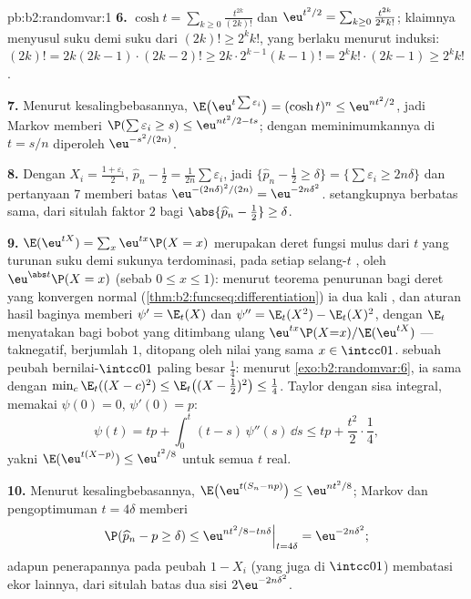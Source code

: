 \begin{solution}{pb:b2:randomvar:1}
\textbf{6.} $\cosh t = \sum_{k\geq0}\frac{t^{2k}}{(2k)!}$ dan
$\eu^{t^2/2} = \sum_{k\geq0}\frac{t^{2k}}{2^kk!}$; klaimnya
menyusul suku demi suku dari $(2k)! \geq 2^kk!$, yang berlaku menurut
induksi: $(2k)! = 2k(2k-1)\cdot(2k-2)! \geq 2k\cdot
2^{k-1}(k-1)! = 2^kk!\cdot(2k-1) \geq 2^kk!$.

\textbf{7.} Menurut kesalingbebasannya, $\E\bigl(\eu^{t\sum\varepsilon_i}
\bigr) = (\cosh t)^n \leq \eu^{nt^2/2}$, jadi Markov memberi
$\P(\sum\varepsilon_i \geq s) \leq \eu^{nt^2/2 - ts}$; dengan
meminimumkannya di $t = s/n$ diperoleh $\eu^{-s^2/(2n)}$.

\textbf{8.} Dengan $X_i = \frac{1 + \varepsilon_i}2$, $\widehat
p_n - \frac12 = \frac1{2n}\sum\varepsilon_i$, jadi
$\{\widehat p_n - \frac12 \geq \delta\} =
\{\sum\varepsilon_i \geq 2n\delta\}$ dan pertanyaan 7 memberi
batas $\eu^{-(2n\delta)^2/(2n)} = \eu^{-2n\delta^2}$. 
setangkupnya berbatas sama, dari situlah faktor $2$ bagi
$\abs{\widehat p_n - \frac12} \geq \delta$.

\textbf{9.} $\E(\eu^{tX}) = \sum_x\eu^{tx}\P(X = x)$ merupakan
deret fungsi mulus dari $t$ yang turunan suku demi
sukunya terdominasi, pada setiap selang-$t$ , oleh
$\eu^{\abs t}\P(X = x)$ (sebab $0 \leq x \leq 1$): menurut
teorema penurunan bagi deret yang konvergen normal
(\cref{thm:b2:funcseq:differentiation}) ia dua kali
, dan aturan hasil baginya memberi $\psi' = \E_t(X)$
dan $\psi'' = \E_t(X^2) - \E_t(X)^2$, dengan $\E_t$ menyatakan
 bagi bobot yang ditimbang ulang
$\eu^{tx}\P(X{=}x)/\E(\eu^{tX})$ --- taknegatif, berjumlah
$1$, ditopang oleh nilai yang sama $x \in \intcc01$. 
sebuah peubah bernilai-$\intcc01$ paling besar $\frac14$: menurut
\cref{exo:b2:randomvar:6}, ia sama dengan $\min_c\E_t((X - c)^2) \leq
\E_t\bigl((X - \tfrac12)^2\bigr) \leq \tfrac14$. Taylor dengan
sisa integral, memakai $\psi(0) = 0$, $\psi'(0) = p$:
\[
\psi(t) = tp + \int_0^t(t - s)\,\psi''(s)\,\dd s
\leq tp + \frac{t^2}2\cdot\frac14,
\]
yakni $\E(\eu^{t(X - p)}) \leq \eu^{t^2/8}$ untuk semua $t$ real.

\textbf{10.} Menurut kesalingbebasannya, $\E\bigl(\eu^{t(S_n -
np)}\bigr) \leq \eu^{nt^2/8}$; Markov dan pengoptimuman $t
= 4\delta$ memberi
\[
\P(\widehat p_n - p \geq \delta)
\leq \eu^{nt^2/8 - tn\delta}\Big|_{t = 4\delta}
= \eu^{-2n\delta^2};
\]
adapun penerapannya pada peubah $1 - X_i$ (yang juga di
$\intcc01$) membatasi ekor lainnya, dari situlah batas dua sisi
$2\eu^{-2n\delta^2}$.


\end{solution}
